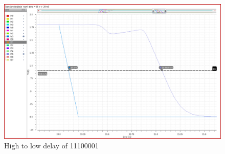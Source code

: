 \documentclass[conference]{IEEEtran}
\begin{document}
\begin{figure}[h!]
    \centering
    \includegraphics[width=0.9\linewidth]{mul_11100001_down_max.png}
    \caption{High to low delay of 11100001}
\end{figure}
\end{document}

